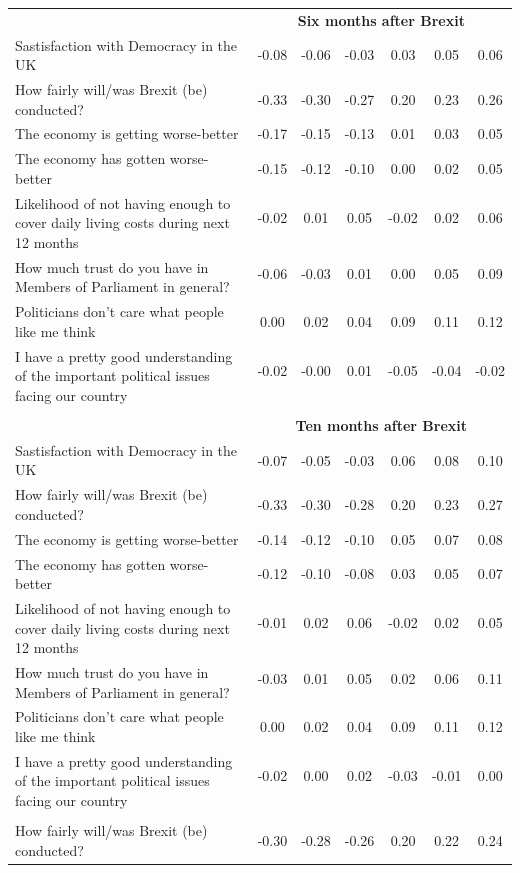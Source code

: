 \documentclass[12pt, letter]{article}
\begin{document}
\begin{center}
\begin{longtable}{lcccccc}
\toprule[1pt]
& \multicolumn{6}{c}{\textbf{Six months after Brexit}} \\[3pt]
Sastisfaction with Democracy in the UK & -0.08 & -0.06 & -0.03 & 0.03 & 0.05 & 0.06 \\ 
How fairly will/was Brexit (be) conducted? & -0.33 & -0.30 & -0.27 & 0.20 & 0.23 & 0.26 \\ 
The economy is getting worse-better & -0.17 & -0.15 & -0.13 & 0.01 & 0.03 & 0.05 \\[3pt] 
The economy has gotten worse-better & -0.15 & -0.12 & -0.10 & 0.00 & 0.02 & 0.05 \\[3pt] 
\multirow{2}{200pt}{Likelihood of not having enough to cover daily living costs during next 12 months} & -0.02 & 0.01 & 0.05 & -0.02 & 0.02 & 0.06 \\ 
\\[3pt]
\multirow{2}{200pt}{How much trust do you have in Members of Parliament in general?} & -0.06 & -0.03 & 0.01 & 0.00 & 0.05 & 0.09 \\ 
\\[3pt]
Politicians don't care what people like me think & 0.00 & 0.02 & 0.04 & 0.09 & 0.11 & 0.12 \\[3pt] 
\multirow{2}{200pt}{I have a pretty good understanding of the important political issues facing our country} & -0.02 & -0.00 & 0.01 & -0.05 & -0.04 & -0.02 \\ 
\\[3pt]
   \\[-7pt]

\toprule[1pt]
& \multicolumn{6}{c}{\textbf{Ten months after Brexit}} \\[3pt]
Sastisfaction with Democracy in the UK & -0.07 & -0.05 & -0.03 & 0.06 & 0.08 & 0.10 \\[3pt] 
How fairly will/was Brexit (be) conducted? & -0.33 & -0.30 & -0.28 & 0.20 & 0.23 & 0.27 \\[3pt]
The economy is getting worse-better & -0.14 & -0.12 & -0.10 & 0.05 & 0.07 & 0.08 \\[3pt] 
The economy has gotten worse-better & -0.12 & -0.10 & -0.08 & 0.03 & 0.05 & 0.07 \\[3pt] 
\multirow{2}{200pt}{Likelihood of not having enough to cover daily living costs during next 12 months} & -0.01 & 0.02 & 0.06 & -0.02 & 0.02 & 0.05 \\ 
\\[3pt]
\multirow{2}{200pt}{How much trust do you have in Members of Parliament in general?} & -0.03 & 0.01 & 0.05 & 0.02 & 0.06 & 0.11 \\ 
\\[3pt]
Politicians don't care what people like me think & 0.00 & 0.02 & 0.04 & 0.09 & 0.11 & 0.12 \\[3pt] 
\multirow{2}{200pt}{I have a pretty good understanding of the important political issues facing our country} & -0.02 & 0.00 & 0.02 & -0.03 & -0.01 & 0.00 \\ 
\\[3pt]
   \\[-7pt]
How fairly will/was Brexit (be) conducted? & -0.30 & -0.28 & -0.26 & 0.20 & 0.22 & 0.24 \\ 


\end{longtable}
\end{center}
\end{document}
